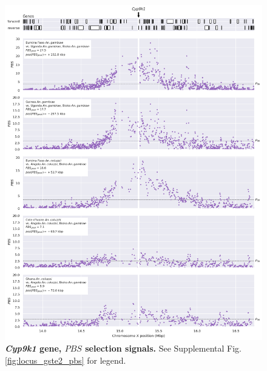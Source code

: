\documentclass[a4paper,11pt,abstracton,hidelinks]{scrartcl}
\begin{document}
\begin{figure}[t!]
	\begin{center}
		\includegraphics*[width=1\linewidth,center]{artwork/locus_cyp9k1_pbs_pdist.png}
	\end{center}
	\caption[\textit{Cyp9k1} gene, $PBS$ selection signals]{
	\textbf{\textit{Cyp9k1} gene, $PBS$ selection signals.}
	See Supplemental Fig. \ref{fig:locus_gste2_pbs} for legend.
	} 
	\label{fig:locus_cyp9k1_pbs}
\end{figure}


\clearpage
\end{document}
